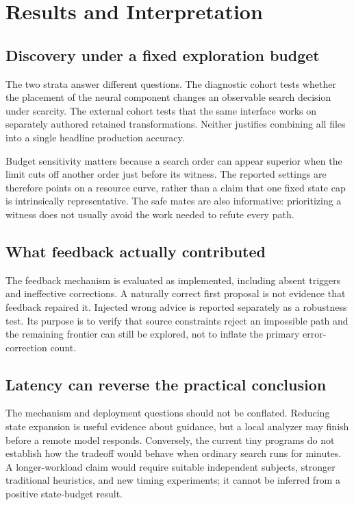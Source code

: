 \documentclass[sigconf]{acmart}
\begin{document}
\section{Results and Interpretation}

\subsection{Discovery under a fixed exploration budget}
\ResourceResultsVThree{}
The two strata answer different questions. The diagnostic cohort tests
whether the placement of the neural component changes an observable
search decision under scarcity. The external cohort tests that the same
interface works on separately authored retained transformations. Neither
justifies combining all files into a single headline production accuracy.

\SensitivityResultsVThree{}
Budget sensitivity matters because a search order can appear superior
when the limit cuts off another order just before its witness. The
reported settings are therefore points on a resource curve, rather than
a claim that one fixed state cap is intrinsically representative.
The safe mates are also informative: prioritizing a witness does not
usually avoid the work needed to refute every path.

\subsection{What feedback actually contributed}
\FeedbackResultsVThree{}
The feedback mechanism is evaluated as implemented, including absent
triggers and ineffective corrections. A naturally correct first proposal
is not evidence that feedback repaired it. Injected wrong advice is
reported separately as a robustness test. Its purpose is to verify that
source constraints reject an impossible path and the remaining frontier
can still be explored, not to inflate the primary error-correction count.

\subsection{Latency can reverse the practical conclusion}
\LatencyResultsVThree{}
The mechanism and deployment questions should not be conflated. Reducing
state expansion is useful evidence about guidance, but a local analyzer
may finish before a remote model responds. Conversely, the current tiny
programs do not establish how the tradeoff would behave when ordinary
search runs for minutes. A longer-workload claim would require suitable
independent subjects, stronger traditional heuristics, and new timing
experiments; it cannot be inferred from a positive state-budget result.
\end{document}
